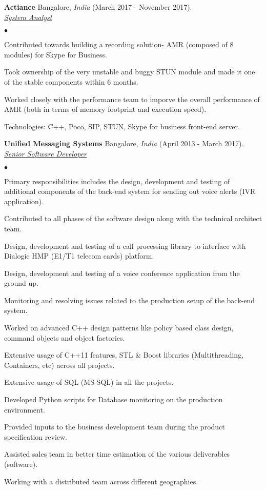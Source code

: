 \documentclass[a4paper]{article}
\newcommand{\employer}[4]{{ \textbf{#1} #2  (#3).\\ \underline{\emph{#4}}\\  }}
\newenvironment{achievements}{\begin{list}{$\bullet$}{\topsep 0pt \itemsep -2pt}}{\vspace*{4pt}\end{list}}
\begin{document}
\employer{Actiance} {Bangalore, \textit{India}} {March 2017 - November 2017} {System Analyst}
	\begin{achievements}
          \item Contributed towards building a recording solution- AMR (composed of 8 modules) for Skype for Business.
          \item Took ownership of the very unstable and buggy STUN module and made it one of the stable components within 6 months.
          \item Worked closely with the performance team to imporve the overall performance of AMR (both in terms of memory footprint and execution speed).
          \item Technologies: C++, Poco, SIP, STUN, Skype for business front-end server.
	\end{achievements}

\employer{Unified Messaging Systems} {Bangalore, \textit{India}} {April 2013 - March 2017} {Senior Software Developer}
	\begin{achievements}
	  \item Primary responsibilities includes the design, development and testing of additional components of the back-end system for sending out voice alerts (IVR application).
	  \item Contributed to all phases of the software design along with the technical architect team.
	  \item Design, development and testing of a call processing library to interface with Dialogic HMP (E1/T1 telecom cards) platform.
	  \item Design, development and testing of a voice conference application from the ground up.
	  \item Monitoring and resolving issues related to the production setup of the back-end system.
	  \item Worked on advanced C++ design patterns like policy based class design, command objects and object factories.
	  \item Extensive usage of C++11 features, STL \& Boost libraries (Multithreading, Containers, etc) across all projects.
	  \item Extensive usage of SQL (MS-SQL) in all the projects.
	  \item Developed Python scripts for Database monitoring on the production environment.
	  \item Provided inputs to the business development team during the product specification review.
	  \item Assisted sales team in better time estimation of the various deliverables (software).
	  \item Working with a distributed team across different geographies.
	\end{achievements}
\end{document}
